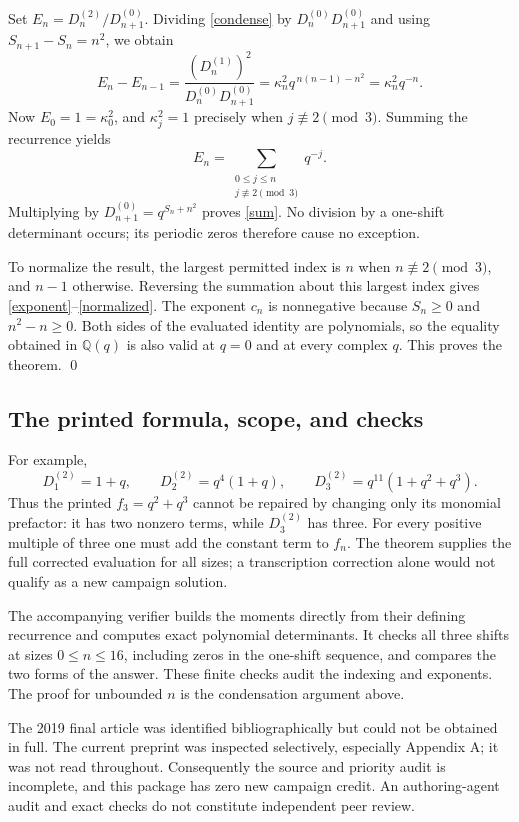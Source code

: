 \documentclass[11pt]{article}
\begin{document}
Set \(E_n=D_n^{(2)}/D_{n+1}^{(0)}\). Dividing
\eqref{condense} by \(D_n^{(0)}D_{n+1}^{(0)}\) and using
\(S_{n+1}-S_n=n^2\), we obtain
\[
 E_n-E_{n-1}
   =\frac{(D_n^{(1)})^2}{D_n^{(0)}D_{n+1}^{(0)}}
   =\kappa_n^2q^{\,n(n-1)-n^2}
   =\kappa_n^2q^{-n}.
\]
Now \(E_0=1=\kappa_0^2\), and
\(\kappa_j^2=1\) precisely when \(j\not\equiv2\pmod3\).
Summing the recurrence yields
\[
 E_n=\sum_{\substack{0\le j\le n\\j\not\equiv2\pmod3}}q^{-j}.
\]
Multiplying by \(D_{n+1}^{(0)}=q^{S_n+n^2}\) proves \eqref{sum}.
No division by a one-shift determinant occurs; its periodic zeros
therefore cause no exception.

To normalize the result, the largest permitted index is \(n\) when
\(n\not\equiv2\pmod3\), and \(n-1\) otherwise.
Reversing the summation about this largest index gives
\eqref{exponent}--\eqref{normalized}. The exponent \(c_n\) is nonnegative
because \(S_n\ge0\) and \(n^2-n\ge0\). Both sides of the evaluated
identity are polynomials, so the equality obtained in
\(\mathbb Q(q)\) is also valid at \(q=0\) and at every complex \(q\).
This proves the theorem. \qed

\subsection*{The printed formula, scope, and checks}
For example,
\[
 D_1^{(2)}=1+q,\qquad D_2^{(2)}=q^4(1+q),\qquad
 D_3^{(2)}=q^{11}(1+q^2+q^3).
\]
Thus the printed \(f_3=q^2+q^3\) cannot be repaired by changing only
its monomial prefactor: it has two nonzero terms, while \(D_3^{(2)}\)
has three. For every positive multiple of three one must add the
constant term to \(f_n\). The theorem supplies the full corrected
evaluation for all sizes; a transcription correction alone would not
qualify as a new campaign solution.

The accompanying verifier builds the moments directly from their
defining recurrence and computes exact polynomial determinants.
It checks all three shifts at sizes \(0\le n\le16\), including zeros
in the one-shift sequence, and compares the two forms of the answer.
These finite checks audit the indexing and exponents. The proof for
unbounded \(n\) is the condensation argument above.

The 2019 final article \cite{OSfinal} was identified bibliographically
but could not be obtained in full. The current preprint was inspected
selectively, especially Appendix A; it was not read throughout.
Consequently the source and priority audit is incomplete, and this
package has zero new campaign credit. An authoring-agent audit and
exact checks do not constitute independent peer review.
\end{document}
